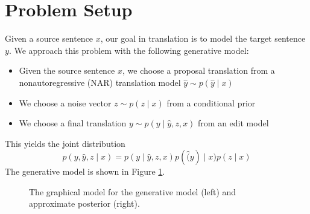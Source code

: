 \documentclass[11pt]{article}
\begin{document}
\section{Problem Setup}
Given a source sentence $x$, our goal in translation is to model the target sentence $y$.
We approach this problem with the following generative model:
\begin{itemize}
\item Given the source sentence $x$, we choose a proposal translation
    from a nonautoregressive (NAR) translation model  $\hat{y}\sim p(\hat{y} \mid x)$
\item We choose a noise vector $z \sim p(z \mid x)$ from a conditional prior
\item We choose a final translation $y \sim p(y \mid \hat{y}, z, x)$ from an edit model
\end{itemize}
This yields the joint distribution
$$p(y,\hat{y},z \mid x) = p(y \mid \hat{y}, z, x)p(\hat(y) \mid x)p(z \mid x)$$
The generative model is shown in Figure \ref{fig:gen-model}.

\begin{figure}
\centering
\begin{subfigure}{0.48\textwidth}
\centering
{}
\end{subfigure}
\hfill
\begin{subfigure}{0.48\textwidth}
\centering
{}
\end{subfigure}

\caption{
\label{fig:gen-model}
The graphical model for the generative model (left)
and approximate posterior (right).
}
\end{figure}
\end{document}
